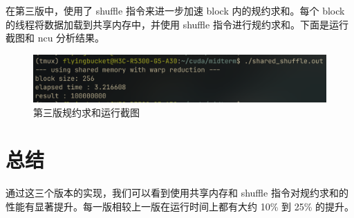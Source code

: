 \documentclass{article}
\begin{document}


在第三版中，使用了 shuffle 指令来进一步加速 block 内的规约求和。每个 block 的线程将数据加载到共享内存中，并使用 shuffle 指令进行规约求和。下面是运行截图和 ncu 分析结果。

\begin{figure}[h]
    \centering
    \includegraphics[width=0.7\linewidth]{./images/reduce_v3.png}
    \caption{第三版规约求和运行截图}
\end{figure}


\section{总结}

通过这三个版本的实现，我们可以看到使用共享内存和 shuffle 指令对规约求和的性能有显著提升。每一版相较上一版在运行时间上都有大约 10\% 到 25\% 的提升。
\end{document}

